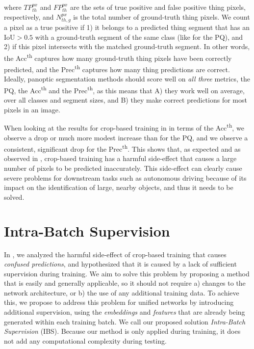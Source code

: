 \documentclass[10pt,twocolumn,letterpaper]{article}
\begin{document}
where $TP^{px}_{th}$ and $FP^{px}_{th}$ are the sets of true positive and false positive thing pixels, respectively, and $N^{px}_{th,g}$ is the total number of ground-truth thing pixels. We count a pixel as a true positive if 1) it belongs to a predicted thing segment that has an $\textrm{IoU} > 0.5$ with a ground-truth segment of the same class (like for the PQ), and 2) if this pixel intersects with the matched ground-truth segment. In other words, the Acc\textsuperscript{th} captures how many ground-truth thing pixels have been correctly predicted, and the Prec\textsuperscript{th} captures how many thing predictions are correct. Ideally, panoptic segmentation methods should score well on \textit{all three} metrics, the PQ, the Acc\textsuperscript{th} and the Prec\textsuperscript{th}, as this means that A) they work well on average, over all classes and segment sizes, and B) they make correct predictions for most pixels in an image.

When looking at the results for crop-based training in  in terms of the Acc\textsuperscript{th}, we observe a drop or much more modest increase than for the PQ, and we observe a consistent, significant drop for the Prec\textsuperscript{th}. This shows that, as expected and as observed in , crop-based training has a harmful side-effect that causes a large number of pixels to be predicted inaccurately. This side-effect can clearly cause severe problems for downstream tasks such as autonomous driving because of its impact on the identification of large, nearby objects, and thus it needs to be solved.























 
\section{Intra-Batch Supervision}
\label{sec:method}
In , we analyzed the harmful side-effect of crop-based training that causes \textit{confused predictions}, and hypothesized that it is caused by a lack of sufficient supervision during training. We aim to solve this problem by proposing a method that is easily and generally applicable, so it should not require a) changes to the network architecture, or b) the use of any additional training data. To achieve this, we propose to address this problem for unified networks by introducing additional supervision, using the \textit{embeddings} and \textit{features} that are already being generated within each training batch. We call our proposed solution \textit{Intra-Batch Supervision} (IBS). Because our method is only applied during training, it does not add any computational complexity during testing.
\end{document}

